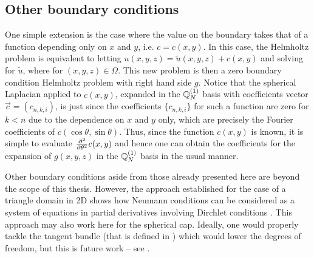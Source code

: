 \subsection{Other boundary conditions}

One simple extension is the case where the value on the boundary takes that of a function depending only on $x$ and $y$, i.e. $c = c(x,y)$. In this case, the Helmholtz problem
is equivalent to letting $u(x,y,z) = \tilde{u}(x,y,z)+ c(x,y)$ and solving
for $\tilde u$, where 
for $(x,y,z) \in \Omega$. This new problem is then a zero boundary condition Helmholtz problem with right hand side $g$. Notice that the spherical Laplacian applied to $c(x,y)$, expanded in the ${\mathbb{Q}}_{N}^{(1)}$ basis with coefficients vector $\vec c = (c_{n,k,i})$, is just
since the coefficients $\{c_{n,k,i}\}$ for such a function are zero for $k < n$ due to the dependence on $x$ and $y$ only, which are precisely the Fourier coefficients of $c(\cos \theta, \sin \theta)$. Thus, since the function $c(x,y)$ is known, it is simple to evaluate ${\partial^{2} \over \partial {\theta}^{2}} c(x,y)$ and hence one can obtain the coefficients for the expansion of $g(x,y,z)$ in the ${\mathbb{Q}}_{N}^{(1)}$ basis in the usual manner.

Other boundary conditions aside from those already presented here are beyond the scope of this thesis. However, the approach established for the case of a triangle domain in 2D shows how Neumann conditions can be considered  as a system of equations in partial derivatives involving Dirchlet conditions \cite{olver2019triangle}. This approach may also work here for the spherical cap. Ideally, one would properly tackle the tangent bundle (that is defined in ) which would lower the degrees of freedom, but this is future work -- see .




